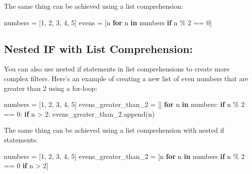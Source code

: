 \documentclass[11pt]{article}
\newenvironment{Shaded}{}{}
\newcommand{\KeywordTok}[1]{\textcolor[rgb]{0.00,0.44,0.13}{\textbf{{#1}}}}
\newcommand{\DecValTok}[1]{\textcolor[rgb]{0.25,0.63,0.44}{{#1}}}
\newcommand{\NormalTok}[1]{{#1}}
\newcommand{\ControlFlowTok}[1]{\textcolor[rgb]{0.00,0.44,0.13}{\textbf{{#1}}}}
\newcommand{\OperatorTok}[1]{\textcolor[rgb]{0.40,0.40,0.40}{{#1}}}
\begin{document}
The same thing can be achieved using a list comprehension:

\begin{Shaded}
\begin{Highlighting}[]
\NormalTok{numbers }\OperatorTok{=}\NormalTok{ [}\DecValTok{1}\NormalTok{, }\DecValTok{2}\NormalTok{, }\DecValTok{3}\NormalTok{, }\DecValTok{4}\NormalTok{, }\DecValTok{5}\NormalTok{]}
\NormalTok{evens }\OperatorTok{=}\NormalTok{ [n }\ControlFlowTok{for}\NormalTok{ n }\KeywordTok{in}\NormalTok{ numbers }\ControlFlowTok{if}\NormalTok{ n }\OperatorTok{\%} \DecValTok{2} \OperatorTok{==} \DecValTok{0}\NormalTok{]}
\end{Highlighting}
\end{Shaded}

\hypertarget{nested-if-with-list-comprehension}{%
\subsection{Nested IF with List
Comprehension:}\label{nested-if-with-list-comprehension}}

You can also use nested if statements in list comprehensions to create
more complex filters. Here's an example of creating a new list of even
numbers that are greater than 2 using a for-loop:

\begin{Shaded}
\begin{Highlighting}[]
\NormalTok{numbers }\OperatorTok{=}\NormalTok{ [}\DecValTok{1}\NormalTok{, }\DecValTok{2}\NormalTok{, }\DecValTok{3}\NormalTok{, }\DecValTok{4}\NormalTok{, }\DecValTok{5}\NormalTok{]}
\NormalTok{evens\_greater\_than\_2 }\OperatorTok{=}\NormalTok{ []}
\ControlFlowTok{for}\NormalTok{ n }\KeywordTok{in}\NormalTok{ numbers:}
    \ControlFlowTok{if}\NormalTok{ n }\OperatorTok{\%} \DecValTok{2} \OperatorTok{==} \DecValTok{0}\NormalTok{:}
        \ControlFlowTok{if}\NormalTok{ n }\OperatorTok{\textgreater{}} \DecValTok{2}\NormalTok{:}
\NormalTok{            evens\_greater\_than\_2.append(n)}
\end{Highlighting}
\end{Shaded}

The same thing can be achieved using a list comprehension with nested if
statements:

\begin{Shaded}
\begin{Highlighting}[]
\NormalTok{numbers }\OperatorTok{=}\NormalTok{ [}\DecValTok{1}\NormalTok{, }\DecValTok{2}\NormalTok{, }\DecValTok{3}\NormalTok{, }\DecValTok{4}\NormalTok{, }\DecValTok{5}\NormalTok{]}
\NormalTok{evens\_greater\_than\_2 }\OperatorTok{=}\NormalTok{ [n }\ControlFlowTok{for}\NormalTok{ n }\KeywordTok{in}\NormalTok{ numbers }\ControlFlowTok{if}\NormalTok{ n }\OperatorTok{\%} \DecValTok{2} \OperatorTok{==} \DecValTok{0} \ControlFlowTok{if}\NormalTok{ n }\OperatorTok{\textgreater{}} \DecValTok{2}\NormalTok{]}
\end{Highlighting}
\end{Shaded}
\end{document}

